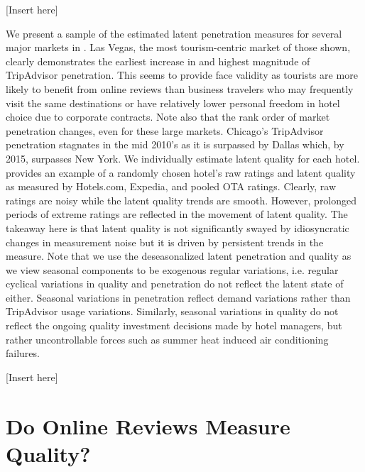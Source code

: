 \documentclass{informs_mod} %
\begin{document}
[Insert  here]

We present a sample of the estimated latent penetration measures for several major markets in . Las Vegas, the most tourism-centric market of those shown, clearly demonstrates the earliest increase in and highest magnitude of TripAdvisor penetration. This seems to provide face validity as tourists are more likely to benefit from online reviews than business travelers who may frequently visit the same destinations or have relatively lower personal freedom in hotel choice due to corporate contracts. Note also that the rank order of market penetration changes, even for these large markets. Chicago's TripAdvisor penetration stagnates in the mid 2010's as it is surpassed by Dallas which, by 2015, surpasses New York. We individually estimate latent quality for each hotel.  provides an example of a randomly chosen hotel's raw ratings and latent quality as measured by Hotels.com, Expedia, and pooled OTA ratings. Clearly, raw ratings are noisy while the latent quality trends are smooth. However, prolonged periods of extreme ratings are reflected in the movement of latent quality. The takeaway here is that latent quality is not significantly swayed by idiosyncratic changes in measurement noise but it is driven by persistent trends in the measure. Note that we use the deseasonalized latent penetration and quality as we view seasonal components to be exogenous regular variations, i.e. regular cyclical variations in quality and penetration do not reflect the latent state of either. Seasonal variations in penetration reflect demand variations rather than TripAdvisor usage variations. Similarly, seasonal variations in quality do not reflect the ongoing quality investment decisions made by hotel managers, but rather uncontrollable forces such as summer heat induced air conditioning failures.

[Insert  here]

\section{Do Online Reviews Measure Quality?} \label{sec:quality}
\end{document}
